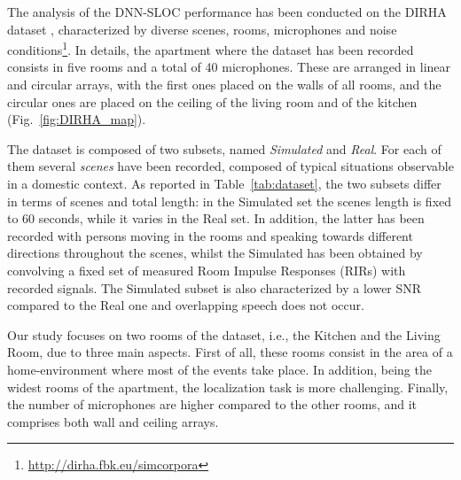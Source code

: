 \documentclass[review]{elsarticle}
\newcommand{\figref}[1]{Fig.~\ref{#1}}
\newcommand{\tableref}[1]{Table~\ref{#1}}
\begin{document}
The analysis of the DNN-SLOC performance has been conducted on the DIRHA dataset \cite{cristoforetti2014dirha}, characterized by diverse scenes, rooms, microphones and noise conditions\footnote{\url{http://dirha.fbk.eu/simcorpora}}. In details, the apartment where the dataset has been recorded consists in five rooms and a total of 40 microphones. These are arranged in linear and circular arrays, with the first ones placed on the walls of all rooms, and the circular ones are placed on the ceiling of the living room and of the kitchen (\figref{fig:DIRHA_map}).

The dataset is composed of two subsets, named \emph{Simulated} and \emph{Real}. For each of them several \textit{scenes} have been recorded, composed of typical situations observable in a domestic context. As reported in \tableref{tab:dataset}, the two subsets differ in terms of scenes and total length: in the Simulated set the scenes length is fixed to 60 seconds, while it varies in the Real set. In addition, the latter has been recorded with persons moving in the rooms and speaking towards different directions throughout the scenes, whilst the Simulated has been obtained by convolving a fixed set of measured Room Impulse Responses (RIRs) with recorded signals.
The Simulated subset is also characterized by a lower SNR compared to the Real one and overlapping speech does not occur.

Our study focuses on two rooms of the dataset, i.e.,  the Kitchen and the Living Room, due to three main aspects. First of all, these rooms consist in the area of a home-environment where most of the events take place. In addition, being the widest rooms of the apartment, the localization task is more challenging. Finally, the number of microphones are higher compared to the other rooms, and it comprises both wall and ceiling arrays.

\begin{table}[t]
	\centering
	\caption{Main differences between the Real and Simulated subsets.}
	\label{tab:dataset}
\end{table}
\end{document}
